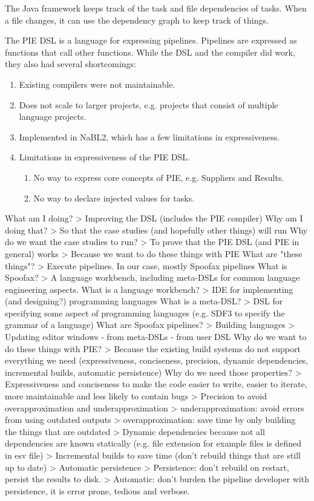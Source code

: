The Java framework keeps track of the task and file dependencies of tasks.
When a file changes, it can use the dependency graph to keep track of things.

The PIE DSL is a language for expressing pipelines.
Pipelines are expressed as functions that call other functions.
While the DSL and the compiler did work, they also had several shortcomings:
\begin{enumerate}
  \item Existing compilers were not maintainable.
  \item Does not scale to larger projects, e.g. projects that consist of multiple language projects.
  \item Implemented in NaBL2, which has a few limitations in expressiveness.
  \item Limitations in expressiveness of the PIE DSL.
  \begin{enumerate}
    \item No way to express core concepts of PIE, e.g. Suppliers and Results.
    \item No way to declare injected values for tasks.
  \end{enumerate}
\end{enumerate}




What am I doing?
> Improving the DSL (includes the PIE compiler)
Why am I doing that?
> So that the case studies (and hopefully other things) will run
Why do we want the case studies to run?
> To prove that the PIE DSL (and PIE in general) works
> Because we want to do these things with PIE
What are "these things"?
> Execute pipelines. In our case, mostly Spoofax pipelines
What is Spoofax?
> A language workbench, including meta-DSLs for common language engineering aspects.
What is a language workbench?
> IDE for implementing (and designing?) programming languages
What is a meta-DSL?
> DSL for specifying some aspect of programming languages (e.g. SDF3 to specify the grammar of a language)
What are Spoofax pipelines?
> Building languages
> Updating editor windows
   - from meta-DSLs
   - from user DSL
Why do we want to do these things with PIE?
> Because the existing build systems do not support everything we need (expressiveness, conciseness, precision, dynamic dependencies, incremental builds, automatic persistence)
Why do we need those properties?
> Expressiveness and conciseness to make the code easier to write, easier to iterate, more maintainable and less likely to contain bugs
> Precision to avoid overapproximation and underapproximation
  > underapproximation: avoid errors from using outdated outputs
  > overapproximation: save time by only building the things that are outdated
> Dynamic dependencies because not all dependencies are known statically (e.g. file extension for example files is defined in esv file)
> Incremental builds to save time (don't rebuild things that are still up to date)
> Automatic persistence
   > Persistence: don't rebuild on restart, persist the results to disk.
   > Automatic: don't burden the pipeline developer with persistence, it is error prone, tedious and verbose.


